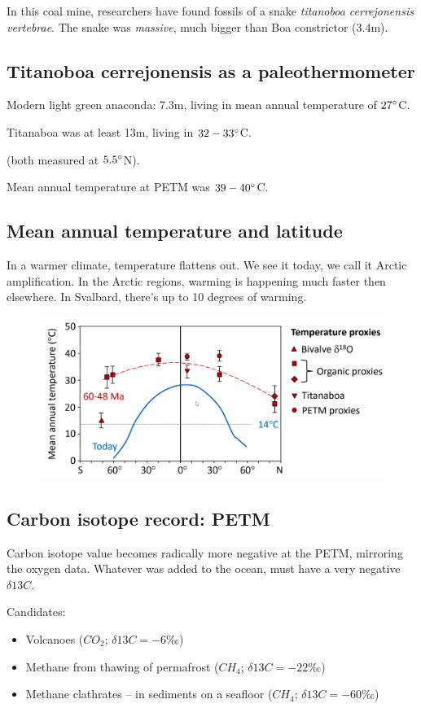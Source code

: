 In this coal mine, researchers have found fossils of a snake \textit{titanoboa
cerrejonensis vertebrae}. The snake was \textit{massive}, much bigger than
Boa constrictor (3.4m).

\subsection{Titanoboa cerrejonensis as a paleothermometer}

Modern light green anaconda: 7.3m, living in mean annual temperature of
$27 \degree$C.

Titanaboa was at least 13m, living in $32-33 \degree$C.

(both measured at $5.5\degree$N).

Mean annual temperature at PETM was $39-40 \degree$C.

\subsection{Mean annual temperature and latitude}

In a warmer climate, temperature flattens out. We see it today, we call it
Arctic amplification. In the Arctic regions, warming is happening much faster
then elsewhere. In Svalbard, there's up to 10 degrees of warming.

\begin{figure}[H]
    \centering
    \includegraphics[width=0.75\linewidth]
    {content/img/temperature_proxies_warming.png}
\end{figure}

\subsection{Carbon isotope record: PETM}

Carbon isotope value becomes radically more negative at the PETM, mirroring the
oxygen data. Whatever was added to the ocean, must have a very negative
$\delta{13}C$.

Candidates:
\begin{itemize}
    \item Volcanoes ($CO_2$; $\delta{13}C = -6‰$)
    \item Methane from thawing of permafrost ($CH_4$; $\delta{13}C = -22‰$)
    \item Methane clathrates -- in sediments on
    a seafloor ($CH_4$; $\delta{13}C = -60‰$)
\end{itemize}

